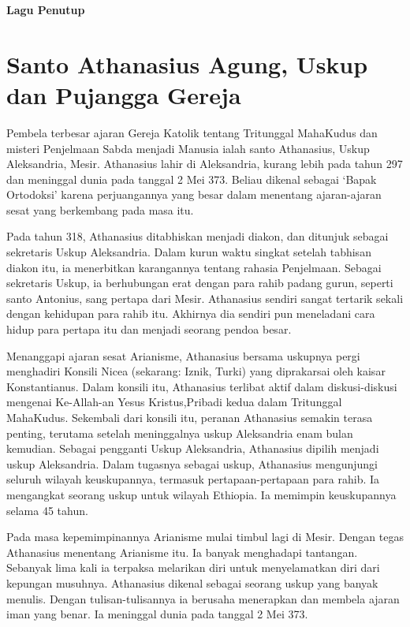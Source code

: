 \documentclass[titlepage,10pt,openany]{scrbook}
\makeatletter
\newcommand{\subjudul}[1]{%
  {\parindent \z@ 
    \interlinepenalty\@M \bfseries #1\par\nobreak \vskip 10\p@ }}
\makeatother
\begin{document}
\subjudul{Lagu Penutup}
 


\newpage
\itshape
\section*{Santo Athanasius Agung, Uskup dan Pujangga Gereja}

Pembela terbesar ajaran Gereja Katolik tentang Tritunggal MahaKudus dan misteri Penjelmaan Sabda menjadi Manusia ialah santo Athanasius, Uskup Aleksandria, Mesir. Athanasius lahir di Aleksandria, kurang lebih pada tahun 297 dan meninggal dunia pada tanggal 2 Mei 373. Beliau dikenal sebagai ‘Bapak Ortodoksi’ karena perjuangannya yang besar dalam menentang ajaran-ajaran sesat yang berkembang pada masa itu.

Pada tahun 318, Athanasius ditabhiskan menjadi diakon, dan ditunjuk sebagai sekretaris Uskup Aleksandria. Dalam kurun waktu singkat setelah tabhisan diakon itu, ia menerbitkan karangannya tentang rahasia Penjelmaan. Sebagai sekretaris Uskup, ia berhubungan erat dengan para rahib padang gurun, seperti santo Antonius, sang pertapa dari Mesir. Athanasius sendiri sangat tertarik sekali dengan kehidupan para rahib itu. Akhirnya dia sendiri pun meneladani cara hidup para pertapa itu dan menjadi seorang pendoa besar.

Menanggapi ajaran sesat Arianisme, Athanasius bersama uskupnya pergi menghadiri Konsili Nicea (sekarang: Iznik, Turki) yang diprakarsai oleh kaisar Konstantianus. Dalam konsili itu, Athanasius terlibat aktif dalam diskusi-diskusi mengenai Ke-Allah-an Yesus Kristus,Pribadi kedua dalam Tritunggal MahaKudus. Sekembali dari konsili itu, peranan Athanasius semakin terasa penting, terutama setelah meninggalnya uskup Aleksandria enam bulan kemudian. Sebagai pengganti Uskup Aleksandria, Athanasius dipilih menjadi uskup Aleksandria. Dalam tugasnya sebagai uskup, Athanasius mengunjungi seluruh wilayah keuskupannya, termasuk pertapaan-pertapaan para rahib. Ia mengangkat seorang uskup untuk wilayah Ethiopia. Ia memimpin keuskupannya selama 45 tahun.

Pada masa kepemimpinannya Arianisme mulai timbul lagi di Mesir. Dengan tegas Athanasius menentang Arianisme itu. Ia banyak menghadapi tantangan. Sebanyak lima kali ia terpaksa melarikan diri untuk menyelamatkan diri dari kepungan musuhnya. Athanasius dikenal sebagai seorang uskup yang banyak menulis. Dengan tulisan-tulisannya ia berusaha menerapkan dan membela ajaran iman yang benar. Ia meninggal dunia pada tanggal 2 Mei 373. 
\end{document}
